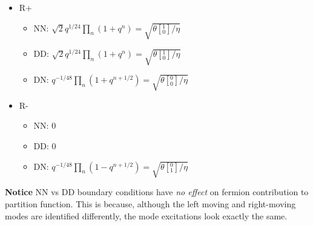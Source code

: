 \documentclass[11pt, class=article, crop=false]{standalone}
\begin{document}
\begin{enumerate}
\begin{itemize}
		\item R+
		\begin{itemize}
			\item NN: $\sqrt 2 q^{1/24}\prod_{n} (1 + q^n) =  \sqrt{\theta[{^1_0}]/\eta}$
			\item DD: $\sqrt 2 q^{1/24}\prod_{n} (1 + q^n) =  \sqrt{\theta[{^1_0}]/\eta}$
			\item DN: $q^{-1/48}  \prod_{n} (1 + q^{n+1/2}) = \sqrt{\theta[{^0_0}]/\eta}$ 
		\end{itemize}
		
		\item R-
		\begin{itemize}
			\item NN: 0
			\item DD: 0
			\item DN: $q^{-1/48} \prod_{n} (1 - q^{n+1/2}) = \sqrt{\theta[{^0_1}]/\eta}$ 
		\end{itemize}
	\end{itemize}
	
	\textbf{Notice} NN vs DD boundary conditions have \emph{no effect} on fermion contribution to partition function. This is because, although the left moving and right-moving modes are identified differently, the mode excitations look exactly the same.
	

\end{enumerate}
\end{document}
